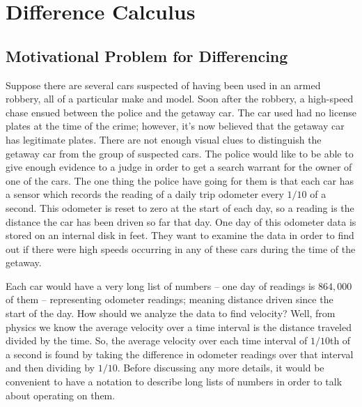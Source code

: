 %
%

\chapter{Difference Calculus}

\section{Motivational Problem for Differencing}
Suppose there are several cars suspected of having been used in an armed
robbery, all of a particular make and model. Soon after the robbery,
a high-speed chase ensued between the police and the getaway car. The
car used had no license plates at the time of the crime; however, it's now believed that 
the getaway car has legitimate plates. There are not enough visual clues 
to distinguish the getaway car from the group of suspected cars. The police 
would like to be able to give enough evidence to a judge in order to 
get a search warrant for the owner of one of the cars. The one thing the 
police have going for them is that each car has a sensor which records the
reading of a daily trip odometer every $1/10$ of a second. This odometer
is reset to zero at the start of each day, so a reading is the distance the
car has been driven so far that day. One day of this odometer data is stored
on an internal disk in feet. They want to examine
the data in order to find out if there were high speeds occurring in any 
of these cars during the time of the getaway. 

Each car would have a
very long list of numbers -- one day of readings is $864{,}000$ of them --
representing odometer readings; meaning distance driven since the start of the day. How should 
we analyze the data to find velocity? Well, from physics we know the 
average velocity over a time interval is the distance traveled divided by 
the time. So, the average velocity over each time interval of $1/10$th of 
a second is found by taking the difference in odometer readings over that 
interval and then dividing by $1/10$. Before discussing any more details, 
it would be convenient to have a notation to describe long lists of numbers 
in order to talk about operating on them. 

